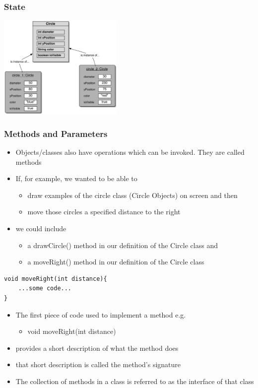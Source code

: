 \documentclass{beamer}
\begin{document}
\begin{frame}
\frametitle{State}
\begin{center}
\includegraphics[height=5cm,keepaspectratio]{./figures/state}
\end{center}
\end{frame}


\begin{frame}[fragile]
\frametitle{Methods and Parameters}
\begin{itemize}
\item Objects/classes also have operations which can be invoked. They are called \alert{methods}
\item If, for example, we wanted to be able to
\begin{itemize}
\item draw examples of the circle class (Circle Objects) on screen and then
\item move those circles a specified distance to the right
\end{itemize}
\item we could include
\begin{itemize}
\item a drawCircle() method in our definition of the Circle class and
\item a moveRight() method in our definition of the Circle class
\end{itemize}
\end{itemize}
\begin{block}{}
\begin{lstlisting}
void moveRight(int distance){
	...some code...
}
\end{lstlisting}
\end{block}
\end{frame}

\begin{frame}
\begin{itemize}
\item The first piece of code used to implement a method e.g.  
\begin{itemize}
\item void moveRight(int distance)
\end{itemize}
\item provides a short description of what the method does
\item that short description is called the method's \alert{signature}
\item The collection of methods in a class is referred to as the \alert{interface} of that class
\end{itemize}
\end{frame}
\end{document}
